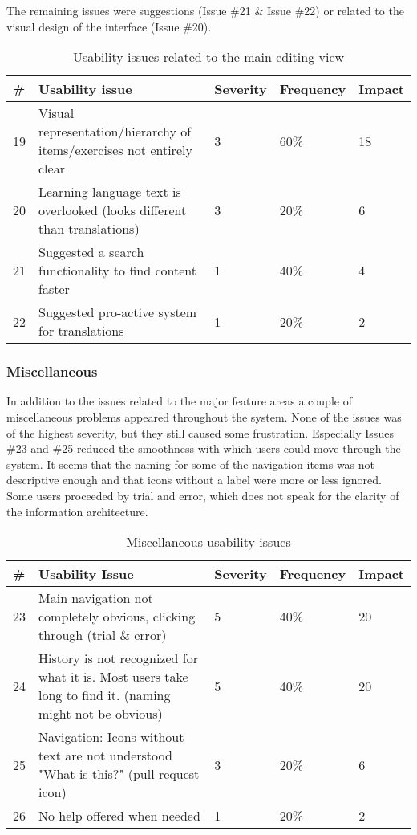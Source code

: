 The remaining issues were suggestions (Issue \#21 \& Issue \#22) or related to the visual design of the interface (Issue \#20).

\begin{table}[h!]
\centering
\begin{tabular}{|l|p{7cm}|l|l|l|}
\hline
\rowcolor[HTML]{EFEFEF}
\textbf{\#} & \textbf{Usability issue} & \textbf{Severity} & \textbf{Frequency} & \textbf{Impact} \\ \hline
19 & Visual representation/hierarchy of items/exercises not entirely clear & 3 & 60\% & 18 \\ \hline
20 & Learning language text is overlooked (looks different than translations) & 3 & 20\% & 6 \\ \hline
21 & Suggested a search functionality to find content faster & 1 & 40\% & 4 \\ \hline
22 & Suggested pro-active system for translations & 1 & 20\% & 2 \\ \hline
\end{tabular}
\caption{Usability issues related to the main editing view}
\label{table:issues-editing-view}
\end{table}


\subsubsection{Miscellaneous}
In addition to the issues related to the major feature areas a couple of miscellaneous problems appeared throughout the system. None of the issues was of the highest severity, but they still caused some frustration. Especially Issues \#23 and \#25 reduced the smoothness with which users could move through the system. It seems that the naming for some of the navigation items was not descriptive enough and that icons without a label were more or less ignored. Some users proceeded by trial and error, which does not speak for the clarity of the information architecture.

\begin{table}[h!]
\centering
\begin{tabular}{|l|p{7cm}|l|l|l|}
\hline
\rowcolor[HTML]{EFEFEF}
\textbf{\#} & \textbf{Usability Issue} & \textbf{Severity} & \textbf{Frequency} & \textbf{Impact} \\ \hline
23 & Main navigation not completely obvious, clicking through (trial \& error) & 5 & 40\% & 20 \\ \hline
24 & History is not recognized for what it is. Most users take long to find it. (naming might not be obvious) & 5 & 40\% & 20 \\ \hline
25 & Navigation: Icons without text are not understood "What is this?" (pull request icon) & 3 & 20\% & 6 \\ \hline
26 & No help offered when needed & 1 & 20\% & 2 \\ \hline
\end{tabular}
\caption{Miscellaneous usability issues}
\label{table:issues-misc}
\end{table}


